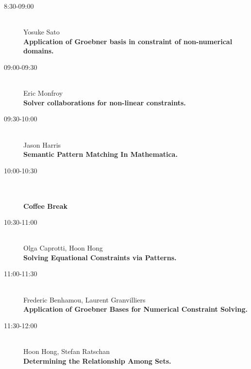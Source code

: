 \begin{description}
\item[8:30-09:00] \ \\
  Yosuke Sato\\
  {\bf Application of Groebner basis in constraint of non-numerical domains.} 
\item[09:00-09:30] \ \\
  Eric Monfroy\\
  {\bf Solver collaborations for non-linear constraints.
} 
\item[09:30-10:00] \ \\
  Jason Harris\\
  {\bf Semantic Pattern Matching In Mathematica.
} 
\item[10:00-10:30] \ \\
  \ \\
  {\bf Coffee Break}
\item[10:30-11:00] \ \\
  Olga Caprotti, Hoon Hong\\
  {\bf Solving Equational Constraints via Patterns.} 
\item[11:00-11:30] \ \\
  Frederic Benhamou, Laurent Granvilliers
\\
  {\bf Application of Groebner Bases for Numerical Constraint Solving.
} 
\item[11:30-12:00] \ \\
  Hoon Hong, Stefan Ratschan\\
  {\bf Determining the Relationship Among Sets.
} 
\end{description}

